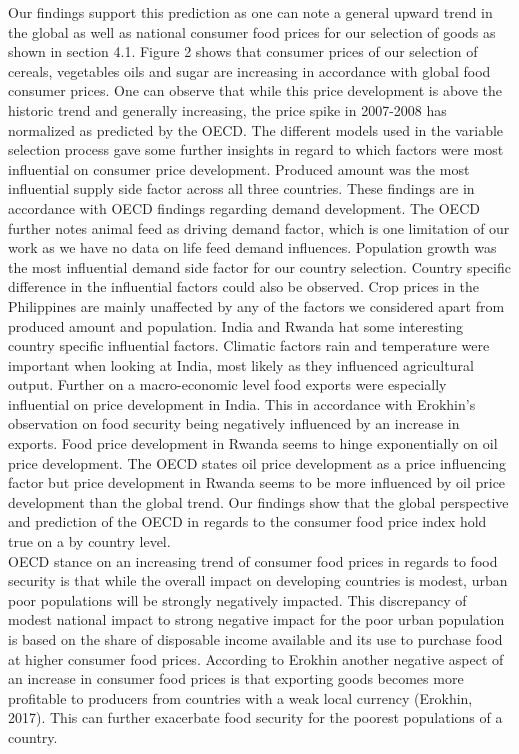\documentclass[11pt]{article}
\begin{document}
Our findings support this prediction as one can note a general upward trend in the global as well as national consumer food prices for our selection of goods as shown in section 4.1. Figure 2 shows that consumer prices of our selection of cereals, vegetables oils and sugar are increasing in accordance with global food consumer prices. One can observe that while this price development is above the historic trend and generally increasing, the price spike in 2007-2008 has normalized as predicted by the OECD. The different models used in the variable selection process gave some further insights in regard to which factors were most influential on consumer price development. Produced amount was the most influential supply side factor across all three countries. These findings are in accordance with OECD findings regarding demand development. The OECD further notes animal feed as driving demand factor, which is one limitation of our work as we have no data on life feed demand influences. Population growth was the most influential demand side factor for our country selection. Country specific difference in the influential factors could also be observed. Crop prices in the Philippines are mainly unaffected by any of the factors we considered apart from produced amount and population. India and Rwanda hat some interesting country specific influential factors. Climatic factors rain and temperature were important when looking at India, most likely as they influenced agricultural output. Further on a macro-economic level food exports were especially influential on price development in India. This in accordance with Erokhin's observation on food security being negatively influenced by an increase in exports. Food price development in Rwanda seems to hinge exponentially on oil price development. The OECD states oil price development as a price influencing factor but price development in Rwanda seems to be more influenced by oil price development than the global trend. Our findings show that the global perspective and prediction of the OECD in regards to the consumer food price index hold true on a by country level. \\
OECD stance on an increasing trend of consumer food prices in regards to food security is that while the overall impact on developing countries is modest, urban poor populations will be strongly negatively impacted. This discrepancy of modest national impact to strong negative impact for the poor urban population is based on the share of disposable income available and its use to purchase food at higher consumer food prices. According to Erokhin another negative aspect of an increase in consumer food prices is that exporting goods becomes more profitable to producers from countries with a weak local currency (Erokhin, 2017). This can further exacerbate food security for the poorest populations of a country. \\
\end{document}
